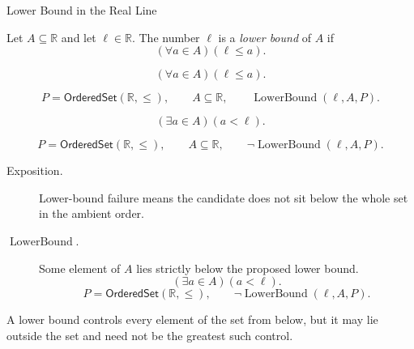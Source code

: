 \begin{definitionbox}{Lower Bound in the Real Line}
\begin{definition}
\label{def:real-lower-bound}
Let $A\subseteq\mathbb{R}$ and let $\ell\in\mathbb{R}$. The number $\ell$
is a \emph{lower bound} of $A$ if
\[
  (\forall a\in A)(\ell\leq a).
\]
\end{definition}
\end{definitionbox}

\begin{remark*}
\[
  (\forall a\in A)(\ell\leq a).
\]
\end{remark*}

\begin{remark*}
\[
  P=\mathsf{OrderedSet}(\mathbb{R},\leq),\qquad A\subseteq\mathbb{R},\qquad
  \operatorname{LowerBound}(\ell,A,P).
\]
\end{remark*}

\begin{remark*}
\[
  (\exists a\in A)(a<\ell).
\]
\end{remark*}

\begin{remark*}
\[
  P=\mathsf{OrderedSet}(\mathbb{R},\leq),\qquad A\subseteq\mathbb{R},\qquad
  \neg\operatorname{LowerBound}(\ell,A,P).
\]
\end{remark*}

\begin{remark*}
\begin{description}
  \item[Exposition.]
  Lower-bound failure means the candidate does not sit below the whole
  set in the ambient order.

  \item[\(\operatorname{LowerBound}.\)]
  Some element of $A$ lies strictly below the proposed lower bound.
  \[
    (\exists a\in A)(a<\ell).
  \]
  \[
    P=\mathsf{OrderedSet}(\mathbb{R},\leq),\qquad
    \neg\operatorname{LowerBound}(\ell,A,P).
  \]
\end{description}
\end{remark*}

\begin{remark*}[Interpretation]
A lower bound controls every element of the set from below, but it may
lie outside the set and need not be the greatest such control.
\end{remark*}

